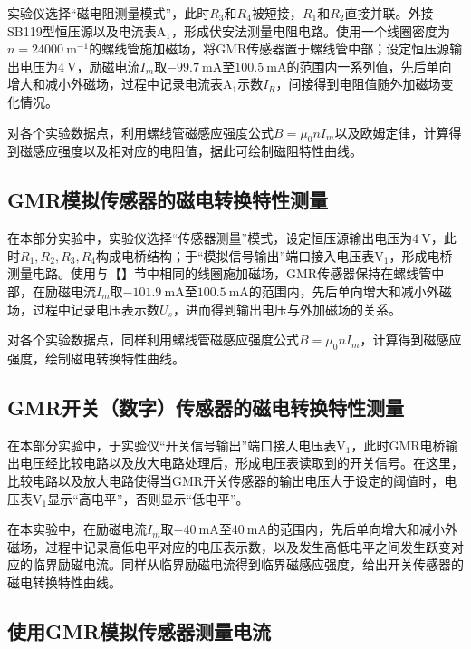 \documentclass{thuemp}
\begin{document}
实验仪选择“磁电阻测量模式”，此时$R_3$和$R_4$被短接，$R_1$和$R_2$直接并联。外接SB119型恒压源以及电流表$\mathrm{A_1}$，形成伏安法测量电阻电路。使用一个线圈密度为$n=24000~ \mathrm{m^{-1}}$的螺线管施加磁场，将GMR传感器置于螺线管中部；设定恒压源输出电压为$4~\mathrm{V}$，励磁电流$I_m$取$-99.7 ~ \mathrm{mA}$至$100.5 ~ \mathrm{mA}$的范围内一系列值，先后单向增大和减小外磁场，过程中记录电流表$\mathrm{A_1}$示数$I_R$，间接得到电阻值随外加磁场变化情况。


对各个实验数据点，利用螺线管磁感应强度公式$B=\mu_0 n I_m$以及欧姆定律，计算得到磁感应强度以及相对应的电阻值，据此可绘制磁阻特性曲线。

\subsection{GMR模拟传感器的磁电转换特性测量}

在本部分实验中，实验仪选择“传感器测量”模式，设定恒压源输出电压为$4~\mathrm{V}$，此时$R_1, R_2, R_3, R_4$构成电桥结构；于“模拟信号输出”端口接入电压表$\mathrm{V_1}$，形成电桥测量电路。使用与【】节中相同的线圈施加磁场，GMR传感器保持在螺线管中部，在励磁电流$I_m$取$-101.9 ~ \mathrm{mA}$至$100.5 ~ \mathrm{mA}$的范围内，先后单向增大和减小外磁场，过程中记录电压表示数$U_s$，进而得到输出电压与外加磁场的关系。

对各个实验数据点，同样利用螺线管磁感应强度公式$B=\mu_0 n I_m$，计算得到磁感应强度，绘制磁电转换特性曲线。

\subsection{GMR开关（数字）传感器的磁电转换特性测量}

在本部分实验中，于实验仪“开关信号输出”端口接入电压表$\mathrm{V_1}$，此时GMR电桥输出电压经比较电路以及放大电路处理后，形成电压表读取到的开关信号。在这里，比较电路以及放大电路使得当GMR开关传感器的输出电压大于设定的阈值时，电压表$\mathrm{V_1}$显示“高电平”，否则显示“低电平”。

在本实验中，在励磁电流$I_m$取$-40 ~ \mathrm{mA}$至$40 ~ \mathrm{mA}$的范围内，先后单向增大和减小外磁场，过程中记录高低电平对应的电压表示数，以及发生高低电平之间发生跃变对应的临界励磁电流。同样从临界励磁电流得到临界磁感应强度，给出开关传感器的磁电转换特性曲线。

\subsection{使用GMR模拟传感器测量电流}
\end{document}
